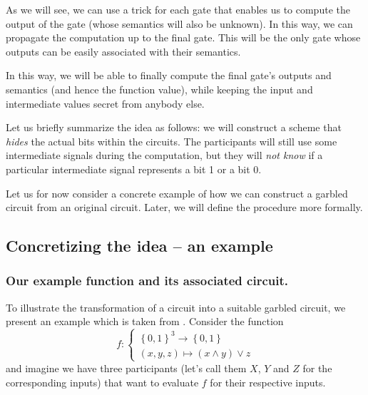 As we will see, we can use a trick for each gate that enables us to compute the output of the gate (whose semantics will also be unknown). In this way, we can propagate the computation up to the final gate. This will be the only gate whose outputs can be easily associated with their semantics.

In this way, we will be able to finally compute the final gate's outputs and semantics (and hence the function value), while keeping the input and intermediate values secret from anybody else.

Let us briefly summarize the idea as follows: we will construct a scheme that \emph{hides} the actual bits within the circuits. The participants will still use some intermediate signals during the computation, but they will \emph{not know} if a particular intermediate signal represents a bit 1 or a bit 0.

Let us for now consider a concrete example of how we can construct a garbled circuit from an original circuit. Later, we will define the procedure more formally.

\subsection{Concretizing the idea -- an example}
\label{sec:concrete-idea}

\subsubsection{Our example function and its associated circuit.}
\label{sec:our-example-function-and-its-circuit}

To illustrate the transformation of a circuit into a suitable garbled circuit, we present an example which is taken from \cite{Rogaway:1991:RCS:888502}. Consider the function 
\begin{equation*}
  f :
  \begin{cases}
    \left\{ 0,1 \right\}^3 \rightarrow \left\{ 0,1 \right\} \\
    (x,y,z) \mapsto (x \wedge y) \vee z
  \end{cases}
\end{equation*}
and imagine we have three participants (let's call them $X$, $Y$ and $Z$ for the corresponding inputs) that want to evaluate $f$ for their respective inputs.


